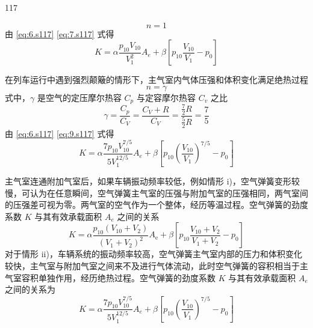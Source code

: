 \begin{solution}{117}
\begin{subsolution}
\begin{subsubsolution}
\begin{equation}
                n = 1
                \label{eq:7.s117}
            \end{equation}
            由 \eqref{eq:6.s117} \eqref{eq:7.s117} 式得
            \begin{equation}
                K = \alpha \frac{p_{10} V_{10}}{V_{1}^{2}} A_{e} + \beta \left[ p_{10} \frac{V_{10}}{V_{1}} - p_{0} \right]
                \label{eq:8.s117}
            \end{equation}
        \end{subsubsolution}
        \begin{subsubsolution}
            在列车运行中遇到强烈颠簸的情形下，主气室内气体压强和体积变化满足绝热过程
            \begin{equation}
                n = \gamma
                \label{eq:9.s117}
            \end{equation}
            式中，$\gamma$ 是空气的定压摩尔热容 $C_{p}$ 与定容摩尔热容 $C_{v}$ 之比
            \begin{equation}
                \gamma = \frac{C_{p}}{C_{V}} = \frac{C_{V} + R}{C_{V}} = \frac{\frac{7}{2} R}{\frac{5}{2} R} = \frac{7}{5}
                \label{eq:10.s117}
            \end{equation}
            由 \eqref{eq:6.s117} \eqref{eq:9.s117} 式得
            \begin{equation}
                K = \alpha \frac{7 p_{10} V_{10}^{7/5}}{5 V_{1}^{12/5}} A_{e} + \beta \left[ p_{10} \left(\frac{V_{10}}{V_{1}}\right)^{7/5} - p_{0} \right]
                \label{eq:11.s117}
            \end{equation}
        \end{subsubsolution}
    \end{subsolution}
    \begin{subsolution}
        主气室连通附加气室后，如果车辆振动频率较低，例如情形 i)，空气弹簧变形较慢，可认为在任意瞬间，空气弹簧主气室的压强与附加气室的压强相同，两气室间的压强差可视为零。两气室的空气作为一个整体，经历等温过程。空气弹簧的劲度系数 $K$ 与其有效承载面积 $A_{e}$ 之间的关系
        \begin{equation}
            K = \alpha \frac{p_{10} (V_{10} + V_{2})}{(V_{1} + V_{2})^{2}} A_{\mathrm{e}} + \beta \left[ p_{10} \frac{V_{10} + V_{2}}{V_{1} + V_{2}} - p_{0} \right]
            \label{eq:12.s117}
        \end{equation}
        对于情形 ii)，车辆系统的振动频率较高，空气弹簧主气室内部的压力和体积变化较快，主气室与附加气室之间来不及进行气体流动，此时空气弹簧的容积相当于主气室容积单独作用，经历绝热过程。空气弹簧的劲度系数 $K$ 与其有效承载面积 $A_{e}$ 之间的关系为
        \begin{equation}
            K = \alpha \frac{7 p_{10} V_{10}^{7/5}}{5 V_{1}^{12/5}} A_{e} + \beta \left[ p_{10} \left(\frac{V_{10}}{V_{1}}\right)^{7/5} - p_{0} \right]
            \label{eq:13.s117}
        \end{equation}
    \end{subsolution}
\end{solution}